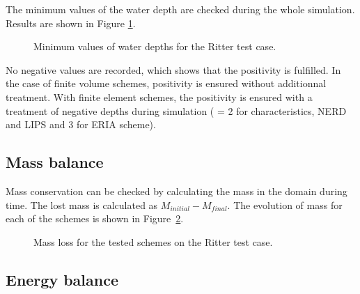 The minimum values of the water depth are checked during the whole simulation.
Results are shown in Figure \ref{t2d:ritter:minmax}.

\begin{figure}[H]
\centering
{}
\caption{Minimum values of water depths for the Ritter test case.}
\label{t2d:ritter:minmax}
\end{figure}

No negative values are recorded, which shows that the positivity is fulfilled.
In the case of finite volume schemes, positivity is ensured without additionnal
treatment.
With finite element schemes, the positivity is ensured with a treatment of
negative depths during simulation ( = 2
for characteristics, NERD and LIPS and 3 for ERIA scheme).

\subsection{Mass balance}

Mass conservation can be checked by calculating the mass in the domain during
time.
The lost mass is calculated as $M_{initial} - M_{final}$.
The evolution of mass for each of the schemes is shown in
Figure~\ref{fig:ritter:VoLTime}.

\begin{figure}[H]
\centering
  \caption{Mass loss for the tested schemes on the Ritter test case.}
\label{fig:ritter:VoLTime}
\end{figure}

\subsection{Energy balance}

